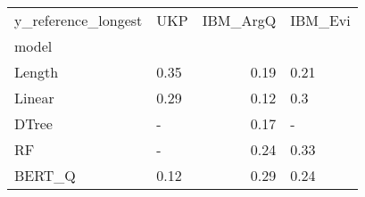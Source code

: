 \begin{tabular}{llrl}
\toprule
y\_reference\_longest &   UKP &  IBM\_ArgQ & IBM\_Evi \\
model  &       &           &         \\
\midrule
Length &  0.35 &      0.19 &    0.21 \\
Linear &  0.29 &      0.12 &     0.3 \\
DTree  &     - &      0.17 &       - \\
RF     &     - &      0.24 &    0.33 \\
BERT\_Q &  0.12 &      0.29 &    0.24 \\
\bottomrule
\end{tabular}
